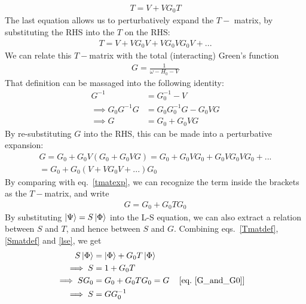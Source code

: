 \documentclass[twoside,11pt]{report}
\numberwithin{equation}{section}
\begin{document}
\begin{equation}\begin{aligned}
	\label{TinG}
	T = V + V G_0 T
\end{aligned}\end{equation}
The last equation allows us to perturbatively expand the \(T-\) matrix, by substituting the RHS into the \(T\) on the RHS:
\begin{equation}\begin{aligned}
T = V + VG_0V + VG_0VG_0V + ...
\label{tmatexp}
\end{aligned}\end{equation}
We can relate this \(T-\)matrix with the total (interacting) Green's function
\begin{equation}\begin{aligned}
	G = \frac{1}{\omega - H_0 - V}
\end{aligned}\end{equation}
That definition can be massaged into the following identity:
\begin{equation}\begin{aligned}
	\label{GinVG}
	G^{-1} &= G_0^{-1} - V\\
	\implies G_0 G^{-1} G &= G_0 G_0^{-1} G - G_0 V G\\
	\implies G &= G_0 + G_0 V G
\end{aligned}\end{equation}
By re-substituting \(G\) into the RHS, this can be made into a perturbative expansion:
\begin{equation}\begin{aligned}
	G = G_0 + G_0 V \left(G_0 + G_0 V G\right) = G_0 + G_0 V G_0 + G_0 V G_0 V G_0 + ... \\
	= G_0 + G_0 \left( V + V G_0 V + ... \right) G_0
\end{aligned}\end{equation}
By comparing with eq.~\ref{tmatexp}, we can recognize the term inside the brackets as the \(T-\)matrix, and write
\begin{equation}\begin{aligned}
	G = G_0 + G_0 T G_0
	\label{G_and_G0}
\end{aligned}\end{equation}
By substituting \(\ket{\Psi} = S\ket{\Phi}\) into the L-S equation, we can also extract a relation between \(S\) and \(T\), and hence between \(S\) and \(G\). Combining eqs.~\ref{Tmatdef},\ref{Smatdef} and \ref{lse}, we get
\begin{align}
	S\ket{\Phi} &= \ket{\Phi} + G_0 T\ket{\Phi}\\
	\implies S &= 1 + G_0 T\\
	\implies SG_0 &= G_0 + G_0 T G_0 = G && \left[\text{eq.~\ref{G_and_G0}}\right]\\
	\implies S &= G  G_0^{-1} \label{SinG}
\end{align}
\end{document}
